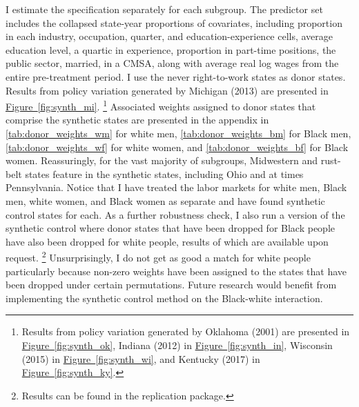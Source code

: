 \documentclass[11pt]{article}
\begin{document}
I estimate the specification separately for each subgroup. The predictor set includes the collapsed state-year proportions of covariates, including proportion in each industry, occupation, quarter, and education-experience cells, average education level, a quartic in experience, proportion in part-time positions, the public sector, married, in a CMSA, along with average real log wages from the entire pre-treatment period. I use the never right-to-work states as donor states. Results from policy variation generated by Michigan (2013) are presented in \hyperref[fig:synth_mi]{Figure~\ref*{fig:synth_mi}}. \footnote{Results from policy variation generated by Oklahoma (2001) are presented in \hyperref[fig:synth_ok]{Figure~\ref*{fig:synth_ok}}, Indiana (2012) in \hyperref[fig:synth_in]{Figure~\ref*{fig:synth_in}}, Wisconsin (2015) in \hyperref[fig:synth_wi]{Figure~\ref*{fig:synth_wi}}, and Kentucky (2017) in \hyperref[fig:synth_ky]{Figure~\ref*{fig:synth_ky}}.} Associated weights assigned to donor states that comprise the synthetic states are presented in the appendix in \autoref{tab:donor_weights_wm} for white men, \autoref{tab:donor_weights_bm} for Black men, \autoref{tab:donor_weights_wf} for white women, and \autoref{tab:donor_weights_bf} for Black women. Reassuringly, for the vast majority of subgroups, Midwestern and rust-belt states feature in the synthetic states, including Ohio and at times Pennsylvania. Notice that I have treated the labor markets for white men, Black men, white women, and Black women as separate and have found synthetic control states for each. As a further robustness check, I also run a version of the synthetic control where donor states that have been dropped for Black people have also been dropped for white people, results of which are available upon request. \footnote{Results can be found in the replication package.} Unsurprisingly, I do not get as good a match for white people particularly because non-zero weights have been assigned to the states that have been dropped under certain permutations. Future research would benefit from implementing the synthetic control method on the Black-white interaction. 
\end{document}
